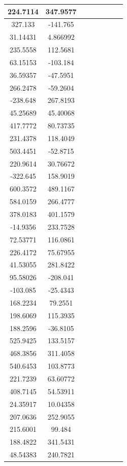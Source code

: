 \documentclass[preprint,review,11pt]{elsarticle}
\begin{document}
\begin{longtable}{|c|c|c|c|c|c|c|c|}
		224.7114 & 347.9577 \\ \hline
		327.133  & -141.765 \\ \hline
		31.14431 & 4.866992 \\ \hline
		235.5558 & 112.5681 \\ \hline
		63.15153 & -103.184 \\ \hline
		36.59357 & -47.5951 \\ \hline
		266.2478 & -59.2604 \\ \hline
		-238.648 & 267.8193 \\ \hline
		45.25689 & 45.40068 \\ \hline
		417.7772 & 80.73735 \\ \hline
		231.4378 & 118.4049 \\ \hline
		503.4451 & -52.8715 \\ \hline
		220.9614 & 30.76672 \\ \hline
		-322.645 & 158.9019 \\ \hline
		600.3572 & 489.1167 \\ \hline
		584.0159 & 266.4777 \\ \hline
		378.0183 & 401.1579 \\ \hline
		-14.9356 & 233.7528 \\ \hline
		72.53771 & 116.0861 \\ \hline
		226.4172 & 75.67955 \\ \hline
		41.53055 & 281.8422 \\ \hline
		95.58026 & -208.041 \\ \hline
		-103.085 & -25.4343 \\ \hline
		168.2234 & 79.2551  \\ \hline
		198.6069 & 115.3935 \\ \hline
		188.2596 & -36.8105 \\ \hline
		525.9425 & 133.5157 \\ \hline
		468.3856 & 311.4058 \\ \hline
		540.6453 & 103.8773 \\ \hline
		221.7239 & 63.60772 \\ \hline
		408.7145 & 54.53911 \\ \hline
		24.35917 & 10.04358 \\ \hline
		207.0636 & 252.9055 \\ \hline
		215.6001 & 99.484   \\ \hline
		188.4822 & 341.5431 \\ \hline
		48.54383 & 240.7821 \\ \hline
		
	\end{longtable}
\end{document}

